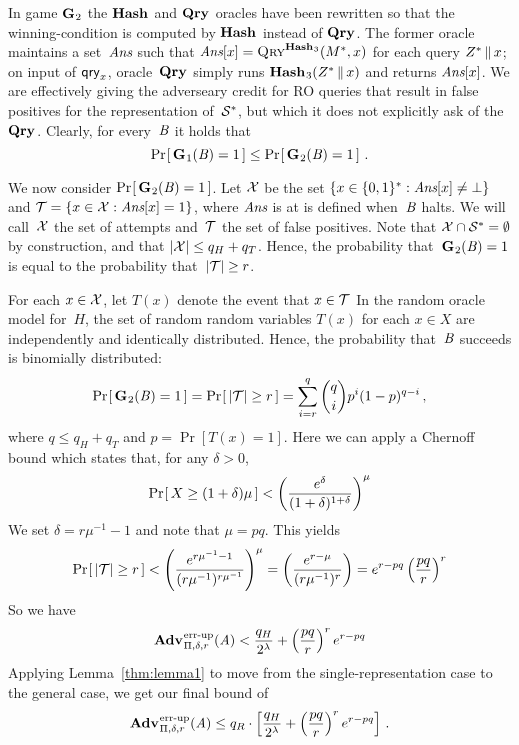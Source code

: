 In game $\textup{\textbf{G}}\hspace{0.5pt}_2$ the $\textup{\textbf{Hash}}\hspace{0.5pt}$ and $\textup{\textbf{Qry}}\hspace{0.5pt}$ oracles have been rewritten so that
the winning-condition is computed by $\textup{\textbf{Hash}}\hspace{0.5pt}$ instead of $\textup{\textbf{Qry}}\hspace{0.5pt}$. The former
oracle maintains a set~$\textit{Ans}$ such that $\textit{Ans}[x] = \textnormal{\textsc{Qry}}^{\textup{\textbf{Hash}}\hspace{0.5pt}_3}(M^*, x)$ for
each query $Z^* \, \| \, x$; on input of $\mathsf{qry}_x$, oracle~$\textup{\textbf{Qry}}\hspace{0.5pt}$ simply runs
$\textup{\textbf{Hash}}\hspace{0.5pt}_3(Z^* \, \| \, x)$ and returns $\textit{Ans}[x]$.
%
We are effectively giving the adverseary credit for RO queries that result in
false positives for the representation of~$\mathcal{S}^*$, but which it does not
explicitly ask of the~$\textup{\textbf{Qry}}\hspace{0.5pt}$. Clearly, for every~$\mathit{B}$ it holds that
%
\begin{equation}
  \Pr\hspace{-1pt}\left[\,\textup{\textbf{G}}\hspace{0.5pt}_1(\mathit{B})=1\,\right] \leq \Pr\hspace{-1pt}\left[\,\textup{\textbf{G}}\hspace{0.5pt}_2(\mathit{B})=1\,\right] \,.
\end{equation}

We now consider $\Pr\hspace{-1pt}\left[\,\textup{\textbf{G}}\hspace{0.5pt}_2(\mathit{B})=1\,\right]$.
%
Let $\mathcal{X}$ be the set $\{ x \in \{0,1\}^* : \textit{Ans}[x] \ne \bot \}$ and $\mathcal{T} = \{x
\in\mathcal{X}: \textit{Ans}[x] = 1\}$, where $\textit{Ans}$ is at is defined when~$\mathit{B}$ halts. We
will call~$\mathcal{X}$ the set of attempts and~$\mathcal{T}$ the set of false positives.
%
Note that $\mathcal{X}\cap\mathcal{S}^*=\emptyset$ by construction, and that
$|\mathcal{X}| \leq q_H + q_T$.
%
Hence, the probability that~$\textup{\textbf{G}}\hspace{0.5pt}_2(\mathit{B})=1$ is equal to the probability
that~$|\mathcal{T}| \geq r$.

For each $x\in\mathcal{X}$, let $T(x)$ denote the event that $x\in\mathcal{T}$
%
In the random oracle model for~$H$, the set of random random variables $T(x)$
for each $x\in X$ are independently and identically distributed.
%
Hence, the probability that~$\mathit{B}$ succeeds is binomially distributed:
%
\begin{equation}
   \Pr\hspace{-1pt}\left[\,\textup{\textbf{G}}\hspace{0.5pt}_2(\mathit{B})=1\,\right] = \Pr\hspace{-1pt}\left[\, |\mathcal{T}| \geq r \,\right] =
     \sum_{i=r}^{q} \binom{q}{i}p^i(1-p)^{q-i} \,,
\end{equation}
%
where $q \leq q_H + q_T$ and $p = \Pr[T(x)=1]$. Here we can apply a Chernoff
bound which states that, for any $\delta > 0$,
%
\begin{equation}
  \Pr\hspace{-1pt}\left[\,X \geq (1+\delta)\mu\,\right] < \left(\frac{e^\delta}{(1+\delta)^{1+\delta}}\right)^\mu
\end{equation}
%
We set $\delta = r\mu^{-1}-1$ and note that $\mu = pq$.
This yields
%
\begin{equation}
 \Pr\hspace{-1pt}\left[\,|\mathcal{T}| \geq r\,\right] < \left(\frac{e^{r\mu^{-1}-1}}{(r\mu^{-1})^{r\mu^{-1}}}\right)^\mu = \left(\frac{e^{r-\mu}}{(r\mu^{-1})^r}\right) = e^{r-pq}\left(\frac{pq}{r}\right)^r
\end{equation}
%
So we have
%
\begin{equation}
  \Adv{\errep}_{\Pi,\delta,r}(\advA) < \frac{q_H}{2^\lambda} + \left(\frac{pq}{r}\right)^re^{r-pq}
\end{equation}
%
Applying Lemma~\ref{thm:lemma1} to move from the single-representation case to the
general case, we get our final bound of
\begin{equation}
  \Adv{\errep}_{\Pi,\delta,r}(\advA) \leq
    q_R \cdot \left[
      \frac{q_H}{2^\lambda} +
      \left(\frac{pq}{r}\right)^re^{r-pq}
    \right] \,.
\end{equation}